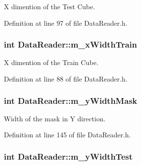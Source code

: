 X dimention of the Test Cube. 



Definition at line 97 of file Data\+Reader.\+h.

\subsubsection[{\texorpdfstring{m\+\_\+x\+Width\+Train}{m_xWidthTrain}}]{\setlength{\rightskip}{0pt plus 5cm}int Data\+Reader\+::m\+\_\+x\+Width\+Train\hspace{0.3cm}{\ttfamily [private]}}\hypertarget{classDataReader_a0c4b86a80694b557fe1509b615b76244}{}\label{classDataReader_a0c4b86a80694b557fe1509b615b76244}


X dimention of the Train Cube. 



Definition at line 88 of file Data\+Reader.\+h.

\subsubsection[{\texorpdfstring{m\+\_\+y\+Width\+Mask}{m_yWidthMask}}]{\setlength{\rightskip}{0pt plus 5cm}int Data\+Reader\+::m\+\_\+y\+Width\+Mask\hspace{0.3cm}{\ttfamily [private]}}\hypertarget{classDataReader_aa381a07a34d528a39ae493aba4d42521}{}\label{classDataReader_aa381a07a34d528a39ae493aba4d42521}


Width of the mask in Y direction. 



Definition at line 145 of file Data\+Reader.\+h.

\subsubsection[{\texorpdfstring{m\+\_\+y\+Width\+Test}{m_yWidthTest}}]{\setlength{\rightskip}{0pt plus 5cm}int Data\+Reader\+::m\+\_\+y\+Width\+Test\hspace{0.3cm}{\ttfamily [private]}}\hypertarget{classDataReader_ac8debe3d06ff92d1d57e90bb5d18a812}{}\label{classDataReader_ac8debe3d06ff92d1d57e90bb5d18a812}


